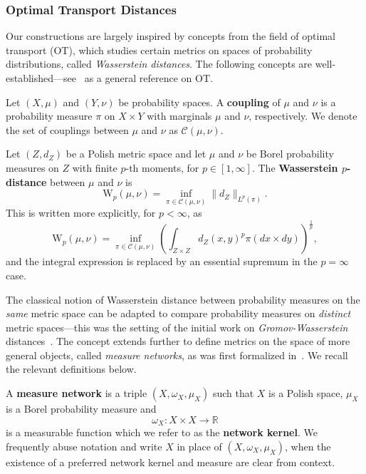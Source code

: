 \documentclass[twoside,11pt]{article}
\theoremstyle{definition}
\newcommand{\R}{\mathbb{R}}
\newcommand{\define}[1]{\textbf{#1}}
\begin{document}
\subsubsection{Optimal Transport Distances}

Our constructions are largely inspired by concepts from the field of optimal transport (OT), which studies certain metrics on spaces of probability distributions, called \emph{Wasserstein distances}. The following concepts are well-established---see~\citep{villani2003topics} as a general reference on OT.

\begin{definition}[Coupling]
    Let $(X,\mu)$ and $(Y,\nu)$ be probability spaces. A \define{coupling} of $\mu$ and $\nu$ is a probability measure $\pi$ on $X \times Y$ with marginals $\mu$ and $\nu$, respectively. We denote the set of couplings between $\mu$ and $\nu$ as $\mathcal{C}(\mu,\nu)$.
\end{definition}

\begin{definition}\label{def:wasserstein}
    Let $(Z,d_Z)$ be a Polish metric space and let $\mu$ and $\nu$ be Borel probability measures on $Z$ with finite $p$-th moments, for $p \in [1,\infty]$. The \define{Wasserstein $p$-distance} between $\mu$ and $\nu$ is
    \[
        \mathrm{W}_p(\mu,\nu) = \inf_{\pi \in \mathcal{C}(\mu,\nu)} \|d_Z\|_{L^p(\pi)}.
    \]
    This is written more explicitly, for $p < \infty$, as
    \[
    \mathrm{W}_p(\mu,\nu) =  \inf_{\pi \in \mathcal{C}(\mu,\nu)} \left(\int_{Z \times Z} d_Z(x,y)^p \pi(dx \times dy)\right)^{\frac{1}{p}},
    \]
    and the integral expression is replaced by an essential supremum in the $p = \infty$ case.
\end{definition}
The classical notion of Wasserstein distance between probability measures on the \emph{same} metric space can be adapted to compare probability measures on \emph{distinct} metric spaces---this was the setting of the initial work on \emph{Gromov-Wasserstein} distances~\citep{memoli2007,memoli2011}. The concept extends further to define metrics on the space of more general objects, called \emph{measure networks}, as was first formalized in~\citep{chowdhury2019gromov}. We recall the relevant definitions below.


\begin{definition}\label{def:measure_network}
    A \define{measure network} is a triple $(X,\omega_X,\mu_X)$ such that $X$ is a Polish space, $\mu_X$ is a Borel probability measure and
    \[
        \omega_X:X \times X \to \R
    \]
    is a measurable function which we refer to as the \define{network kernel}. We frequently abuse notation and write $X$ in place of $(X,\omega_X,\mu_X)$, when the existence of a preferred network kernel and measure are clear from context.
\end{definition}
\end{document}
